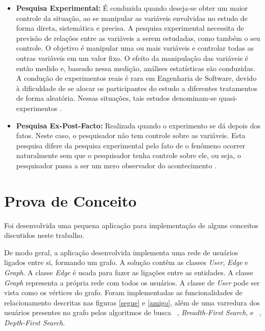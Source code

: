 \begin{apendicesenv}
\begin{itemize}
\begin{itemize}
			\item \textbf{Pesquisa Experimental:} É conduzida quando deseja-se obter um maior controle da situação, ao se manipular as variáveis envolvidas no estudo de forma direta, sistemática e precisa. A pesquisa experimental necessita de previsão de relações entre as variáveis a serem estudadas, como também o seu controle. O objetivo é manipular uma ou mais variáveis e controlar todas as outras variáveis em um valor fixo. O efeito da manipulação das variáveis é então medido e, baseado nessa medição, análises estatísticas são conduzidas. A condução de experimentos reais é rara em Engenharia de Software, devido à dificuldade de se alocar os participantes do estudo a diferentes tratamentos de forma aleatória. Nessas situações, tais estudos denominam-se quasi-experimentos \cite{Mafra:Travassos:2006}.
			
			\item \textbf{Pesquisa Ex-Post-Facto:} Realizada quando o experimento se dá depois dos fatos. Neste caso, o pesquisador não tem controle sobre as variáveis. Esta pesquisa difere da pesquisa experimental pelo fato de o fenômeno ocorrer naturalmente sem que o pesquisador tenha controle sobre ele, ou seja, o pesquisador passa a ser um mero observador do acontecimento \cite{Silva:Tafner:2007}.
		\end{itemize}

\end{itemize}

\chapter{Prova de Conceito}
\label{chap:prova_conceito}

Foi desenvolvida uma pequena aplicação para implementação de alguns conceitos discutidos neste trabalho.

De modo geral, a aplicação desenvolvida implementa uma rede de usuários ligados entre si, formando um grafo. A solução contêm as classes \textit{User}, \textit{Edge} e \textit{Graph}. A classe \textit{Edge} é usada para fazer as ligações entre as entidades. A classe \textit{Graph} representa a própria rede com todos os usuários. A classe de \textit{User} pode ser vista como os vértices do grafo. Foram implementadas as funcionalidades de relacionamento descritas nas figuras \ref{segue} e \ref{amigo}, além de uma varredura dos usuários presentes no grafo pelos algoritmos de busca ~, \textit{Breadth-First Search}, e ~, \textit{Depth-First Search}.


\end{apendicesenv}

